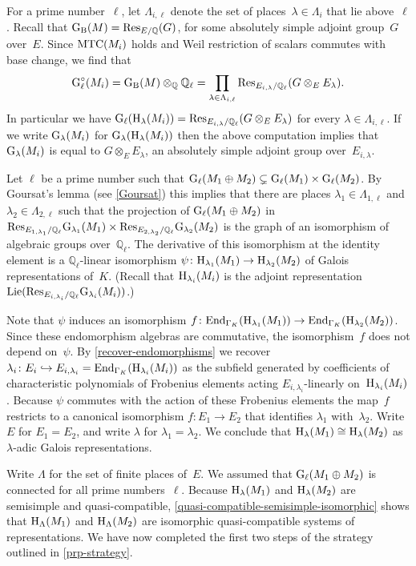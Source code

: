 \documentclass[10pt,twoside,leqno]{article}
\numberwithin{equation}{subsection}
\newcommand{\into}{\hookrightarrow}
\newcommand{\End}{\textnormal{End}}
\newcommand{\QQ}{\mathbb{Q}}
\newcommand{\QQl}{\QQ_{\ell}}
\newcommand{\Lie}{\textnormal{Lie}}
\newcommand{\HH}{\textnormal{H}}
\newcommand{\Hlambda}{\HH_{\lambda}}
\newcommand{\HLambda}{\HH_{\Lambda}}
\newcommand{\GG}{\textnormal{G}}
\newcommand{\GB}{\GG_{\textnormal{B}}}
\newcommand{\Gl}{\GG_{\ell}}
\newcommand{\Glc}{\Gl^{\circ}}
\newcommand{\Glambda}{\GG_{\lambda}}
\newcommand{\Res}{\textnormal{Res}}
\newcommand{\MTC}{\textnormal{MTC}}
\begin{document}
For a prime number~$\ell$, let $\Lambda_{i,\ell}$
denote the set of places~$\lambda \in \Lambda_i$ that lie above~$\ell$.
Recall that $\GB(M) = \Res_{E/\QQ}(G)$,
for some absolutely simple adjoint group~$G$ over~$E$.
Since $\MTC(M_i)$ holds
and Weil restriction of scalars commutes with base change,
we find that
\[
\Glc(M_i) = \GB(M) \otimes_\QQ \QQl
= \prod_{\lambda \in \Lambda_{i,\ell}}
\Res_{E_{i,\lambda}/\QQl} (G \otimes_E E_\lambda).
\]
In particular we have
$\Gl(\Hlambda(M_i)) = \Res_{E_{i,\lambda}/\QQl} (G \otimes_E E_\lambda)$
for every $\lambda \in \Lambda_{i,\ell}$.
If we write $\Glambda(M_i)$ for $\Glambda(\Hlambda(M_i))$
then the above computation implies that
$\Glambda(M_i)$ is equal to $G \otimes_E E_\lambda$,
an absolutely simple adjoint group over~$E_{i,\lambda}$.

Let $\ell$ be a prime number
such that $\Gl(M_1 \oplus M_2) \subsetneq \Gl(M_1) \times \Gl(M_2)$.
By Goursat's lemma (see \cref{Goursat}) this implies that there are
places $\lambda_1 \in \Lambda_{1,\ell}$ and $\lambda_2 \in \Lambda_{2,\ell}$
such that the projection of $\Gl(M_1 \oplus M_2)$ in
$\Res_{E_{1,\lambda_1}/\QQl} \GG_{\lambda_1}(M_1) \times
\Res_{E_{2,\lambda_2}/\QQl} \GG_{\lambda_2}(M_2)$
is the graph of an isomorphism of algebraic groups over~$\QQl$.
The derivative of this isomorphism at the identity element
is a $\QQl$-linear isomorphism
$\psi \colon \HH_{\lambda_1}(M_1) \to \HH_{\lambda_2}(M_2)$
of Galois representations of~$K$.
(Recall that $\HH_{\lambda_i}(M_i)$ is the adjoint representation
$\Lie(\Res_{E_{i,\lambda_i}/\QQl} \GG_{\lambda_i}(M_i))$.)

Note that $\psi$ induces an isomorphism
$f \colon \End_{\Gamma_K}(\HH_{\lambda_1}(M_1)) \to
\End_{\Gamma_K}(\HH_{\lambda_2}(M_2))$.
Since these endomorphism algebras are commutative,
the isomorphism~$f$ does not depend on~$\psi$.
By \cref{recover-endomorphisms} we recover
$\lambda_i \colon E_i \into E_{i,\lambda_i} =
\End_{\Gamma_K}(\HH_{\lambda_i}(M_i))$
as the subfield generated by coefficients of
characteristic polynomials of Frobenius elements
acting $E_{i,\lambda_i}$-linearly on~$\HH_{\lambda_i}(M_i)$.
Because $\psi$ commutes with the action of these Frobenius elements
the map~$f$ restricts to a canonical isomorphism
$f \colon E_1 \to E_2$ that identifies $\lambda_1$ with~$\lambda_2$.
Write $E$ for $E_1 = E_2$,
and write $\lambda$ for $\lambda_1 = \lambda_2$.
We conclude that $\Hlambda(M_1) \cong \Hlambda(M_2)$
as $\lambda$-adic Galois representations.

Write $\Lambda$ for the set of finite places of~$E$.
We assumed that $\Gl(M_{1} \oplus M_{2})$
is connected for all prime numbers~$\ell$.
Because $\Hlambda(M_1)$ and $\Hlambda(M_2)$
are semisimple and quasi-compatible,
\cref{quasi-compatible-semisimple-isomorphic}
shows that $\HLambda(M_1)$ and $\HLambda(M_2)$
are isomorphic quasi-compatible systems of representations.
We have now completed the first two steps of the strategy
outlined in \cref{prp-strategy}.
\end{document}
